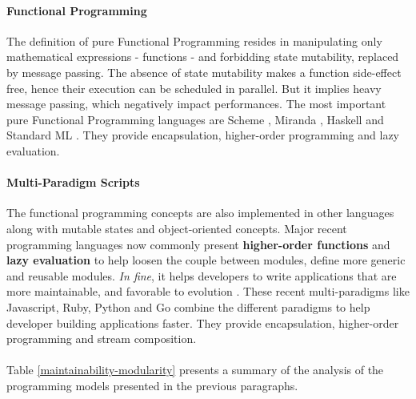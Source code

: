 \paragraph{Functional Programming} \label{chapter3:software-maintainability:programming-models:functional-programming}


The definition of pure Functional Programming resides in manipulating only mathematical expressions - functions - and forbidding state mutability, replaced by message passing.
The absence of state mutability makes a function side-effect free, hence their execution can be scheduled in parallel.
But it implies heavy message passing, which negatively impact performances.
The most important pure Functional Programming languages are Scheme \cite{Rees1986}, Miranda \cite{Turner1986}, Haskell \cite{Hudak1992} and Standard ML \cite{Milner1997}.
They provide encapsulation, higher-order programming and lazy evaluation.

\paragraph{Multi-Paradigm Scripts}

The functional programming concepts are also implemented in other languages along with mutable states and object-oriented concepts.
Major recent programming languages now commonly present \textbf{higher-order functions} and \textbf{lazy evaluation} to help loosen the couple between modules, define more generic and reusable modules.
\textit{In fine}, it helps developers to write applications that are more maintainable, and favorable to evolution \cite{Hughes1989,Turner1981}.
These recent multi-paradigms like Javascript, Ruby, Python and Go combine the different paradigms to help developer building applications faster.
They provide encapsulation, higher-order programming and stream composition.

\paragraph{}

Table \ref{maintainability-modularity} presents a summary of the analysis of the programming models presented in the previous paragraphs.

